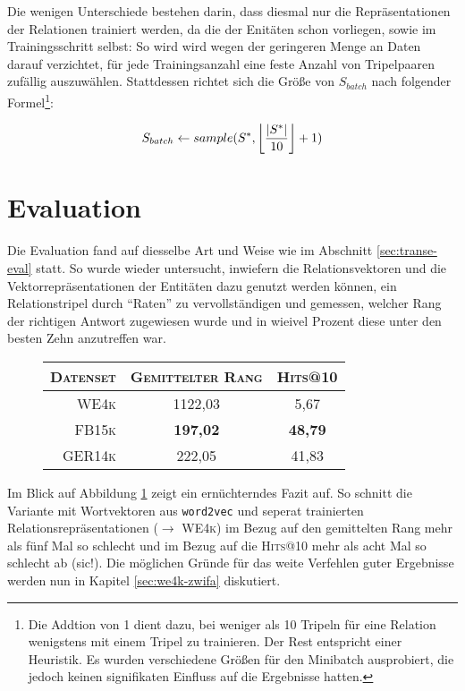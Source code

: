 Die wenigen Unterschiede bestehen darin, dass diesmal nur die Repräsentationen der Relationen trainiert werden,
da die der Enitäten schon vorliegen, sowie im Trainingsschritt selbst: So wird wird wegen der geringeren Menge an
Daten darauf verzichtet, für jede Trainingsanzahl eine feste Anzahl von Tripelpaaren zufällig auszuwählen.
Stattdessen richtet sich die Größe von $S_{batch}$ nach folgender Formel\footnote{Die Addtion von 1 dient dazu, bei weniger
als 10 Tripeln für eine Relation wenigstens mit einem Tripel zu trainieren. Der Rest entspricht einer Heuristik. Es wurden
verschiedene Größen für den Minibatch ausprobiert, die jedoch keinen signifikaten Einfluss auf die Ergebnisse hatten.}:

\begin{equation}
  S_{batch} \leftarrow sample(S^*, \floor*{\frac{|S^*|}{10}}+1)
\end{equation}

\section{Evaluation}

Die Evaluation fand auf diesselbe Art und Weise wie im Abschnitt \ref{sec:transe-eval} statt. So wurde wieder untersucht,
inwiefern die Relationsvektoren und die Vektorrepräsentationen der Entitäten dazu genutzt werden können, ein Relationstripel
durch ``Raten'' zu vervollständigen und gemessen, welcher Rang der richtigen Antwort zugewiesen wurde und in wieivel Prozent
diese unter den besten Zehn anzutreffen war.

\begin{figure}[h]
  \centering
  \begin{tabular}{r||c|c}
    \textsc{Datenset} & \textsc{Gemittelter Rang} & \textsc{Hits@10} \\
     \hline
     \textsc{WE4k} & 1122,03 & 5,67 \\
     \textsc{FB15k} & \textbf{197,02} & \textbf{48,79} \\
     \textsc{GER14k} & 222,05 & 41,83 \\
  \end{tabular}
  \caption[Resultate auf mit Wordvektoren auf \textsc{WE3k}]{\label{fig:eval-we4k}}
\end{figure}

Im Blick auf Abbildung \ref{fig:eval-we4k} zeigt ein ernüchterndes Fazit auf. So schnitt die Variante
mit Wortvektoren aus \verb|word2vec| und seperat trainierten Relationsrepräsentationen ($\rightarrow$ \textsc{WE4k}) im Bezug auf
den gemittelten Rang mehr als fünf Mal so schlecht und im Bezug auf die \textsc{Hits@10} mehr als acht Mal so schlecht ab (sic!).
Die möglichen Gründe für das weite Verfehlen guter Ergebnisse werden nun in Kapitel \ref{sec:we4k-zwifa} diskutiert.

